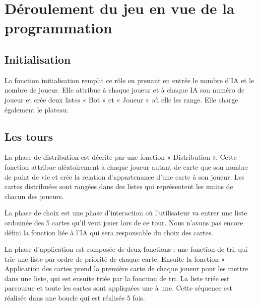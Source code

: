 \documentclass[a4paper,12pt]{report}
\begin{document}
	\section{Déroulement du jeu en vue de la programmation}

		\subsection{Initialisation}

La fonction initialisation remplit ce rôle en prenant en entrée le nombre d’IA et le nombre de joueur. Elle attribue à chaque joueur et à chaque IA son numéro de joueur et crée deux listes « Bot » et « Joueur » où elle les range. Elle charge également le plateau.

		\subsection{Les tours}

La phase de distribution est décrite par une fonction « Distribution ». Cette fonction attribue aléatoirement à chaque joueur autant de carte que son nombre de point de vie et crée la relation d’appartenance d’une carte à son joueur. Les cartes distribuées sont rangées dans des listes qui représentent les mains de chacun des joueurs.

La phase de choix est une phase d’interaction où l’utilisateur va entrer une liste ordonnée des 5 cartes qu’il veut jouer lors de ce tour. Nous n’avons pas encore défini la fonction liée à l’IA qui sera responsable du choix des cartes.

La phase d’application est composée de deux fonctions : une fonction de tri, qui trie une liste par ordre de priorité de chaque carte. Ensuite la fonction « Application des cartes prend la première carte de chaque joueur pour les mettre dans une liste, qui est ensuite triée par la fonction de tri. La liste triée est parcourue et toute les cartes sont appliquées une à une. Cette séquence est réalisée dans une boucle qui est réalisée 5 fois. 

	
\end{document}
